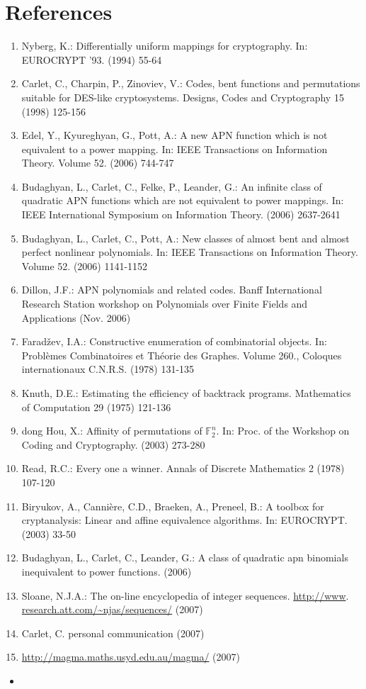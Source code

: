 \documentclass[10pt]{article}
\begin{document}
\section*{References}
\begin{enumerate}
  \item Nyberg, K.: Differentially uniform mappings for cryptography. In: EUROCRYPT '93. (1994) 55-64
  \item Carlet, C., Charpin, P., Zinoviev, V.: Codes, bent functions and permutations suitable for DES-like cryptosystems. Designs, Codes and Cryptography 15 (1998) 125-156
  \item Edel, Y., Kyureghyan, G., Pott, A.: A new APN function which is not equivalent to a power mapping. In: IEEE Transactions on Information Theory. Volume 52. (2006) 744-747
  \item Budaghyan, L., Carlet, C., Felke, P., Leander, G.: An infinite class of quadratic APN functions which are not equivalent to power mappings. In: IEEE International Symposium on Information Theory. (2006) 2637-2641
  \item Budaghyan, L., Carlet, C., Pott, A.: New classes of almost bent and almost perfect nonlinear polynomials. In: IEEE Transactions on Information Theory. Volume 52. (2006) 1141-1152
  \item Dillon, J.F.: APN polynomials and related codes. Banff International Research Station workshop on Polynomials over Finite Fields and Applications (Nov. 2006)
  \item Faradžev, I.A.: Constructive enumeration of combinatorial objects. In: Problèmes Combinatoires et Théorie des Graphes. Volume 260., Coloques internationaux C.N.R.S. (1978) 131-135
  \item Knuth, D.E.: Estimating the efficiency of backtrack programs. Mathematics of Computation 29 (1975) 121-136
  \item dong Hou, X.: Affinity of permutations of $\mathbb{F}_{2}^{n}$. In: Proc. of the Workshop on Coding and Cryptography. (2003) 273-280
  \item Read, R.C.: Every one a winner. Annals of Discrete Mathematics 2 (1978) 107-120
  \item Biryukov, A., Cannière, C.D., Braeken, A., Preneel, B.: A toolbox for cryptanalysis: Linear and affine equivalence algorithms. In: EUROCRYPT. (2003) 33-50
  \item Budaghyan, L., Carlet, C., Leander, G.: A class of quadratic apn binomials inequivalent to power functions. (2006)
  \item Sloane, N.J.A.: The on-line encyclopedia of integer sequences. \href{http://www}{http://www}. \href{http://research.att.com/~njas/sequences/}{research.att.com/\~{}njas/sequences/} (2007)
  \item Carlet, C. personal communication (2007)
  \item \href{http://magma.maths.usyd.edu.au/magma/}{http://magma.maths.usyd.edu.au/magma/} (2007)
\end{enumerate}

\begin{itemize}
  \item 
\end{itemize}
\end{document}
